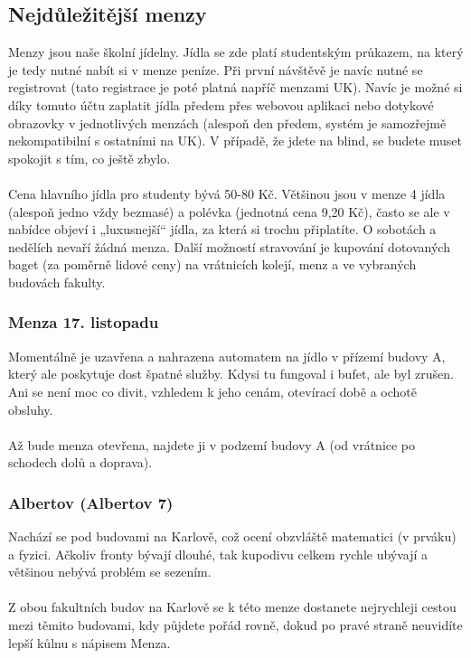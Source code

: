 \subsection{Nejdůležitější menzy}
Menzy jsou naše školní jídelny. Jídla se zde platí studentským průkazem, na
který je tedy nutné nabít si v menze peníze. Při první návštěvě je navíc nutné
se registrovat (tato registrace je poté platná napříč menzami UK). Navíc je
možné si díky tomuto účtu zaplatit jídla předem přes webovou aplikaci nebo
dotykové obrazovky v jednotlivých menzách (alespoň den předem, systém je
samozřejmě nekompatibilní s ostatními na UK). V případě, že jdete na blind, se
budete muset spokojit s tím, co ještě zbylo.
\\\\
Cena hlavního jídla pro studenty bývá 50-80 Kč. Většinou jsou v menze 4 jídla
(alespoň jedno vždy bezmasé) a polévka (jednotná cena 9,20 Kč), často se ale v
nabídce objeví i „luxusnejší“ jídla, za která si trochu připlatíte. O sobotách a
nedělích nevaří žádná menza. Další možností stravování je kupování dotovaných
baget (za poměrně lidové ceny) na vrátnicích kolejí, menz a ve vybraných
budovách fakulty.


\subsubsection{Menza 17. listopadu}
Momentálně je uzavřena a nahrazena automatem na jídlo v přízemí budovy A, který
ale poskytuje dost špatné služby. Kdysi tu fungoval i bufet, ale byl zrušen. Ani
se není moc co divit, vzhledem k jeho cenám, otevírací době a ochotě obsluhy.
\\\\
Až bude menza otevřena, najdete ji v podzemí budovy A (od vrátnice po schodech
dolů a doprava).


\subsubsection{Albertov (Albertov 7)}
Nachází se pod budovami na Karlově, což ocení obzvláště matematici (v prváku) a
fyzici. Ačkoliv fronty bývají dlouhé, tak kupodivu celkem rychle ubývají a
většinou nebývá problém se sezením.
\\\\
Z obou fakultních budov na Karlově se k této menze dostanete nejrychleji cestou
mezi těmito budovami, kdy půjdete pořád rovně, dokud po pravé straně neuvidíte
lepší kůlnu s nápisem Menza.



